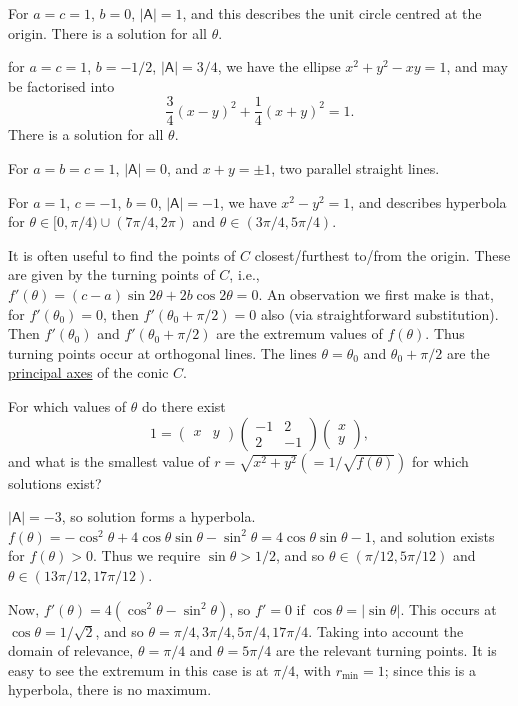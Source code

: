 \documentclass[10pt,notitlepage]{revtex4-1}
\newenvironment{example}[1][Example]{\begin{trivlist}
\item[\hskip \labelsep {\bfseries #1}]}{\end{trivlist}}
\begin{document}
\begin{example}
	For $a=c=1$, $b=0$, $|\mathsf{A}|=1$, and this describes the unit circle
	centred at the origin. There is a solution for all $\theta$.
	
	for $a=c=1$, $b=-1/2$, $|\mathsf{A}|=3/4$, we have the ellipse $x^2 + y^2
	-xy = 1$, and may be factorised into
	\begin{equation}
		\frac{3}{4}(x-y)^2 + \frac{1}{4}(x+y)^2 = 1.
	\end{equation}
	There is a solution for all $\theta$.
	
	For $a=b=c=1$, $|\mathsf{A}|=0$, and $x+y=\pm1$, two parallel straight
	lines.
	
	For $a=1$, $c=-1$, $b=0$, $|\mathsf{A}|=-1$, we have $x^2 - y^2 = 1$, and
	describes hyperbola for $\theta\in[0,\pi/4)\cup(7\pi/4,2\pi)$ and
	$\theta\in(3\pi/4,5\pi/4)$.
\end{example}

It is often useful to find the points of $C$ closest/furthest to/from the
origin. These are given by the turning points of $C$, i.e.,
$f'(\theta)=(c-a)\sin2\theta+2b\cos2\theta=0$. An observation we first make is
that, for $f'(\theta_0)=0$, then $f'(\theta_0+\pi/2)=0$ also (via
straightforward substitution). Then $f'(\theta_0)$ and $f'(\theta_0 + \pi/2)$
are the extremum values of $f(\theta)$. Thus turning points occur at orthogonal
lines. The lines $\theta=\theta_0$ and $\theta_0+\pi/2$ are the
\underline{principal axes} of the conic $C$.
\begin{example}
	For which values of $\theta$ do there exist
	\begin{equation}
		1=\begin{pmatrix}x & y\end{pmatrix}
		\begin{pmatrix}-1 & 2 \\ 2 & -1\end{pmatrix}
		\begin{pmatrix}x\\y\end{pmatrix},
	\end{equation}
	and what is the smallest value of $r=\sqrt{x^2+y^2}(=1/\sqrt{f(\theta)})$
	for which solutions exist?
	
	$|\mathsf{A}|=-3$, so solution forms a hyperbola.
	$f(\theta)=-\cos^2\theta+4\cos\theta\sin\theta-\sin^2\theta
	=4\cos\theta\sin\theta-1$, and solution exists for $f(\theta)>0$. Thus we
	require $\sin\theta>1/2$, and so $\theta\in(\pi/12,5\pi/12)$ and
	$\theta\in(13\pi/12,17\pi/12)$.
	
	Now, $f'(\theta)=4(\cos^2\theta-\sin^2\theta)$, so $f'=0$ if
	$\cos\theta=|\sin\theta|$. This occurs at $\cos\theta=1/\sqrt{2}$, and so
	$\theta=\pi/4,3\pi/4,5\pi/4,17\pi/4$. Taking into account the domain of
	relevance, $\theta=\pi/4$ and $\theta=5\pi/4$ are the relevant turning
	points. It is easy to see the extremum in this case is at $\pi/4$, with
	$r_{\min}=1$; since this is a hyperbola, there is no maximum.
\end{example}
\end{document}

